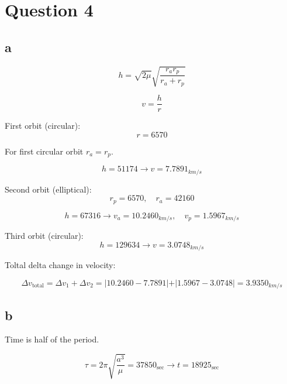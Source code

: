 \section{Question 4}

\subsection{a}
$$
h = 
\sqrt{2\mu}\sqrt{\dfrac{r_a r_p}{r_a + r_p}}
$$

$$
v = \dfrac{h}{r}
$$

First orbit (circular):
$$
r = 6570
$$

For first circular orbit $r_a = r_p$.

$$
h = 51174 \to v = 7.7891_{km/s}
$$

Second orbit (elliptical):
$$
r_p = 6570, \quad r_a = 42160
$$

$$
h = 67316 \to v_a = 10.2460_{km/s}, \quad v_p = 1.5967_{km/s}
$$

Third orbit (circular):
$$
h = 129634 \to v = 3.0748_{km/s}
$$

Toltal delta change in velocity:

$$
\Delta v_{\text{total}} = \Delta v_1 + \Delta v_2 = \vert 10.2460 - 7.7891 \vert + \vert 1.5967 - 3.0748 \vert = 3.9350_{km/s}
$$



\subsection{b}
Time is half of the period.

$$
\tau = 2\pi \sqrt{\dfrac{a^3}{\mu}} = 37850_{\sec} \to t = 18925_{\sec}
$$